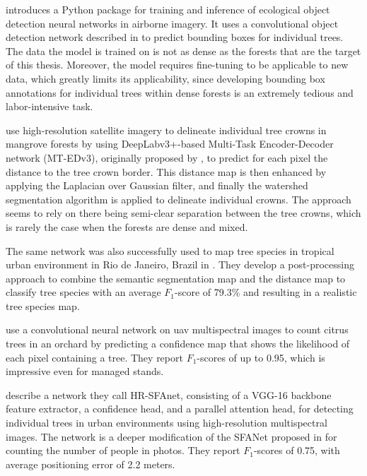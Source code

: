 \citet{weinsteinDeepForestPythonPackage2020} introduces a Python package for training and inference of ecological object detection neural networks in airborne imagery.
It uses a convolutional object detection network described in \citet{weinsteinIndividualTreeCrownDetection2019} to predict bounding boxes for individual trees.
The data the model is trained on is not as dense as the forests that are the target of this thesis.
Moreover, the model requires fine-tuning to be applicable to new data, which greatly limits its applicability, since developing bounding box annotations for individual trees within dense forests is an extremely tedious and labor-intensive task.

\citet{lassalleDeepLearningbasedIndividual2022} use high-resolution satellite imagery to delineate individual tree crowns in mangrove forests by using DeepLabv3+-based Multi-Task Encoder-Decoder network (MT-EDv3), originally proposed by \citet{larosaMultitaskFullyConvolutional2021}, to predict for each pixel the distance to the tree crown border.
This distance map is then enhanced by applying the Laplacian over Gaussian filter, and finally the watershed segmentation algorithm is applied to delineate individual crowns.
The approach seems to rely on there being semi-clear separation between the tree crowns, which is rarely the case when the forests are dense and mixed.

The same network was also successfully used to map tree species in tropical urban environment in Rio de Janeiro, Brazil in \citet{martinsDeepLearningbasedTree2021}.
They develop a post-processing approach to combine the semantic segmentation map and the distance map to classify tree species with an average $F_1$-score of 79.3\% and resulting in a realistic tree species map.

\citet{oscoConvolutionalNeuralNetwork2020} use a convolutional neural network on \gls{uav} multispectral images to count citrus trees in an orchard by predicting a confidence map that shows the likelihood of each pixel containing a tree.
They report $F_1$-scores of up to 0.95, which is impressive even for managed stands.

\citet{venturaIndividualTreeDetection2024} describe a network they call HR-SFAnet, consisting of a VGG-16 \citep{simonyanVeryDeepConvolutional2014} backbone feature extractor, a confidence head, and a parallel attention head, for detecting individual trees in urban environments using high-resolution multispectral images.
The network is a deeper modification of the SFANet proposed in \citet{zhuDualPathMultiScale2019} for counting the number of people in photos.
They report $F_1$-scores of 0.75, with average positioning error of 2.2 meters.


